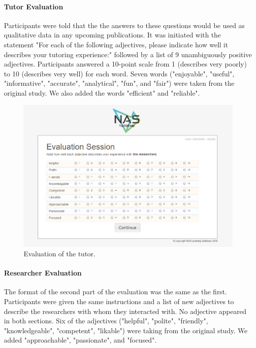 \documentclass{sig-alternate-05-2015}
\begin{document}
\paragraph{Tutor Evaluation}
Participants were told that the the answers to these questions would be used as qualitative data in any upcoming publications.  It was initiated with the statement "For each of the following adjectives, please indicate how well it describes your tutoring experience:" followed by a list of 9 unambiguously positive adjectives.  Participants answered a 10-point scale from 1 (describes very poorly) to 10 (describes very well) for each word.  Seven words ("enjoyable", "useful", "informative", "accurate", "analytical", "fun", and "fair") were taken from the original study.  We also added the words "efficient" and "reliable".

\begin{figure}[!h]
    \includegraphics[width=\linewidth]{figures/website/13_eval2.png}
    \caption{Evaluation of the tutor.}
\end{figure}

\paragraph{Researcher Evaluation}
The format of the second part of the evaluation was the same as the first. Participants were given the same instructions  and a list of new adjectives to describe the researchers with whom they interacted with.  No adjective appeared in both sections.  Six of the adjectives ("helpful", "polite", "friendly", "knowledgeable", "competent", "likable") were taking from the original study. We added "approachable", "passionate", and "focused".
\end{document}

